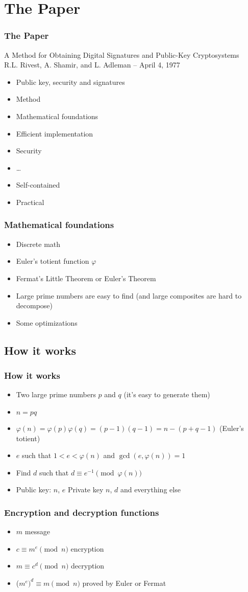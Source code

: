 \documentclass{beamer}
\begin{document}
\section{The Paper}

\begin{frame}
	\frametitle{The Paper}
		A Method for Obtaining Digital Signatures and Public-Key Cryptosystems \\
		R.L. Rivest, A. Shamir, and L. Adleman -- April 4, 1977
		\begin{itemize}
			\item Public key, security and signatures
			\item Method
			\item Mathematical foundations
			\item Efficient implementation
			\item Security
			\item \ldots
			\item Self-contained
			\item Practical
		\end{itemize}
\end{frame}

\begin{frame}
	\frametitle{Mathematical foundations}
	\begin{itemize}
		\item Discrete math
		\item Euler's totient function $\varphi$
		\item Fermat's Little Theorem or Euler's Theorem
		\item Large prime numbers are easy to find (and large
		      composites are hard to decompose)
		\item Some optimizations
	\end{itemize}
\end{frame}

\subsection{How it works}

\begin{frame}
	\frametitle{How it works}
	\begin{itemize}
		\item Two large prime numbers $p$ and $q$ (it's easy to
		      generate them)
		\item $n = pq$
		\item $\varphi(n) = \varphi(p)\varphi(q) = (p-1)(q-1) = n - (p + q -1)$
		      (Euler's totient)
		\item $e$ such that $1 < e < \varphi(n)$ and $\gcd(e, \varphi(n)) = 1$
		\item Find $d$ such that $d \equiv e^{-1} \pmod{\varphi(n)}$
		\item Public key: $n$, $e$ Private key $n$, $d$ and everything else
	\end{itemize}
\end{frame}

\begin{frame}
	\frametitle{Encryption and decryption functions}
	\begin{itemize}
		\item $m$ message
		\item $c \equiv m^e \pmod{n}$ encryption
		\item $m \equiv c^d \pmod{n}$ decryption
		\item ($m^e)^d \equiv m \pmod{n}$ proved by Euler or Fermat
	\end{itemize}
\end{frame}
\end{document}
